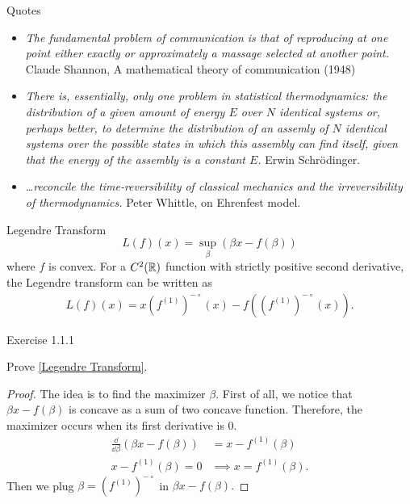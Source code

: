 \documentclass[../main.tex]{subfiles}
\begin{document}
\begin{pbox}{Quotes}
    \begin{itemize}
        \item \textit{The fundamental problem of communication is that of reproducing at one point either exactly or approximately a massage selected at another point.}
        \newline
        Claude Shannon, A mathematical theory of communication (1948)
        \item \textit{There is, essentially, only one problem in statistical thermodynamics: the distribution of a given amount of energy $E$ over $N$ identical systems or, perhaps better, to determine the distribution of an assemly of $N$ identical systems over the possible states in which this assembly can find itself, given that the energy of the assembly is a constant $E$.}
        \newline
        Erwin Schr\"{o}dinger.
        \item \textit{\dots reconcile the time-reversibility of classical mechanics and the irreversibility of thermodynamics.}
        \newline
        Peter Whittle, on Ehrenfest model.
    \end{itemize}
\end{pbox}
\begin{gbox}{Legendre Transform}
\[
L(f)(x) = \sup_\beta (\beta x - f(\beta))
\] where $f$ is convex. For a $C^2(\mathbb{R})$ function with strictly positive second derivative, the Legendre transform can be written as 
\begin{align}
L(f)(x) = x\left(f^{(1)}\right)^{-\circ}(x) - f\left(\left(f^{(1)}\right)^{-\circ}(x)\right). \label{Legendre Transform}
\end{align}
    
\end{gbox}
\begin{bbox}{Exercise 1.1.1}

Prove \eqref{Legendre Transform}.
\begin{proof}
The idea is to find the maximizer $\beta$. First of all, we notice that $\beta x - f(\beta)$ is concave as a sum of two concave function. Therefore, the maximizer occurs when its first derivative is $0$. 
    \begin{align}
        \frac{\dd}{\dd \beta}(\beta x - f(\beta)) &= x - f^{(1)}(\beta)\\
        x-f^{(1)}(\beta)=0 &\implies x = f^{(1)}(\beta).
    \end{align}
Then we plug $\beta = (f^{(1)})^{-\circ}$ in $\beta x - f(\beta).$
\end{proof}
    
\end{bbox}
\end{document}
